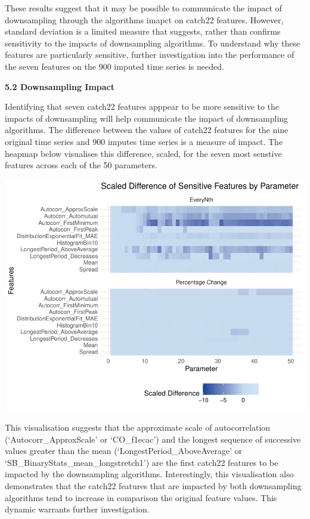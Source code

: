 \documentclass{article}
\begin{document}
These results suggest that it may be possible to communicate the impact
of downsampling through the algorithms imapct on catch22 features.
However, standard deviation is a limited measure that suggests, rather
than confirms sensitivity to the impacts of downsampling algorithms. To
understand why these features are particularly sensitive, further
investigation into the performance of the seven features on the 900
imputed time series is needed.

\textbf{5.2 Downsampling Impact}

Identifying that seven catch22 features apppear to be more sensitive to
the impacts of downsampling will help communicate the impact of
downsampling algorithms. The difference between the values of catch22
features for the nine original time series and 900 imputes time series
is a measure of impact. The heapmap below visualises this difference,
scaled, for the seven most senstive features across each of the 50
parameters.

\includegraphics{210431461_CSC8639_Dissertation_files/figure-latex/Heatmap_param-1.pdf}

This visualisation suggests that the approximate scale of
autocorrelation (`Autocorr\_ApproxScale' or `CO\_f1ecac') and the
longest sequence of successive values greater than the mean
(`LongestPeriod\_AboveAverage' or `SB\_BinaryStats\_mean\_longstretch1')
are the first catch22 features to be impacted by the downsampling
algorithms. Interestingly, this visualisation also demonstrates that the
catch22 features that are impacted by both downsampling algorithms tend
to increase in comparison the original feature values. This dynamic
warrants further investigation.
\end{document}
